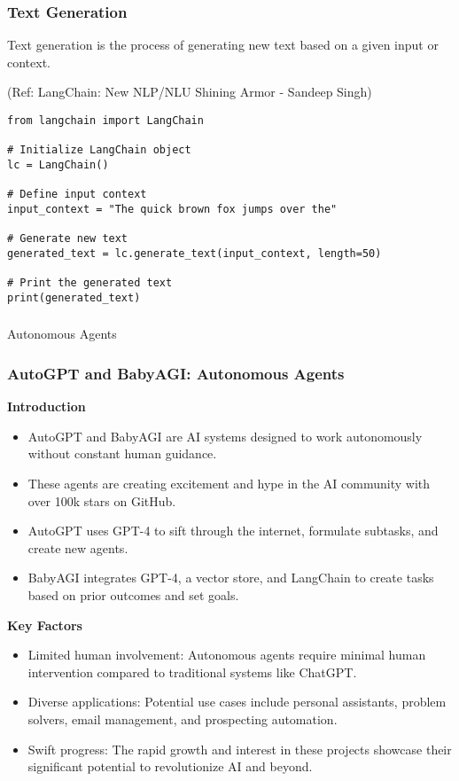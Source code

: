 \begin{frame}[fragile]\frametitle{Text Generation}

Text generation is the process of generating new text based on a given input or context. 

{\tiny (Ref: LangChain: New NLP/NLU Shining Armor - Sandeep Singh)}

\begin{lstlisting}
from langchain import LangChain

# Initialize LangChain object
lc = LangChain()

# Define input context
input_context = "The quick brown fox jumps over the"

# Generate new text
generated_text = lc.generate_text(input_context, length=50)

# Print the generated text
print(generated_text)
\end{lstlisting}	  

\end{frame}

\begin{frame}[fragile]\frametitle{}
\begin{center}
{\Large Autonomous Agents}
\end{center}
\end{frame}


\begin{frame}[fragile]
\frametitle{AutoGPT and BabyAGI: Autonomous Agents}

\textbf{Introduction}
\begin{itemize}
    \item AutoGPT and BabyAGI are AI systems designed to work autonomously without constant human guidance.
    \item These agents are creating excitement and hype in the AI community with over 100k stars on GitHub.
    \item AutoGPT uses GPT-4 to sift through the internet, formulate subtasks, and create new agents.
    \item BabyAGI integrates GPT-4, a vector store, and LangChain to create tasks based on prior outcomes and set goals.
\end{itemize}

\textbf{Key Factors}
\begin{itemize}
    \item Limited human involvement: Autonomous agents require minimal human intervention compared to traditional systems like ChatGPT.
    \item Diverse applications: Potential use cases include personal assistants, problem solvers, email management, and prospecting automation.
    \item Swift progress: The rapid growth and interest in these projects showcase their significant potential to revolutionize AI and beyond.
\end{itemize}

\end{frame}

